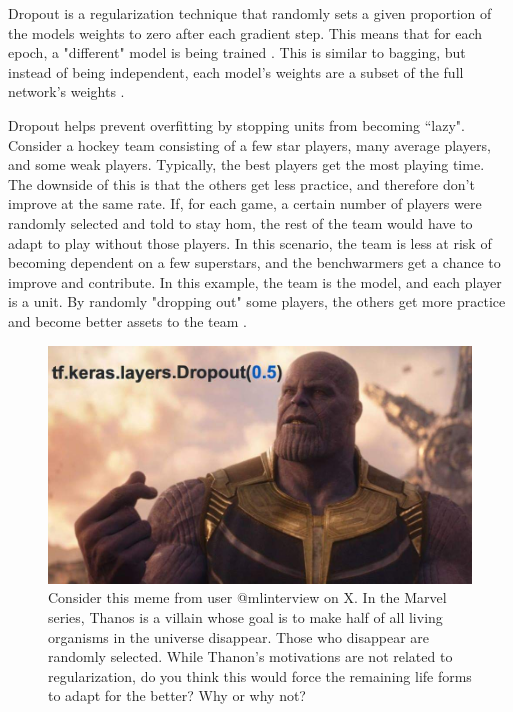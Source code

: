 \documentclass{article}
\begin{document}
Dropout is a regularization technique that randomly sets a given proportion of the models weights to zero after each gradient step. This means that for each epoch, a "different" model is being trained \cite{Srivastava14}. This is similar to bagging, but instead of being independent, each model's weights are a subset of the full network's weights \cite{Goodfellow-et-al-2016}.

Dropout helps prevent overfitting by stopping units from becoming ``lazy". Consider a hockey team consisting of a few star players, many average players, and some weak players. Typically, the best players get the most playing time. The downside of this is that the others get less practice, and therefore don't improve at the same rate. If, for each game, a certain number of players were randomly selected and told to stay hom, the rest of the team would have to adapt to play without those players. In this scenario, the team is less at risk of becoming dependent on a few superstars, and the benchwarmers get a chance to improve and contribute. In this example, the team is the model, and each player is a unit. By randomly "dropping out" some players, the others get more practice and become better assets to the team \cite{hands-on-ml}.

\begin{figure}[h]
    \centering
    \includegraphics[scale = 0.24]{dl-figures/thanos-dropout-meme.jpg}
    \caption{Consider this meme from user @mlinterview on X. In the Marvel series, Thanos is a villain whose goal is to make half of all living organisms in the universe disappear. Those who disappear are randomly selected. While Thanon's motivations are not related to regularization, do you think this would force the remaining life forms to adapt for the better? Why or why not?}
    \label{figure:thanos-dropout-meme}
\end{figure}
\end{document}
